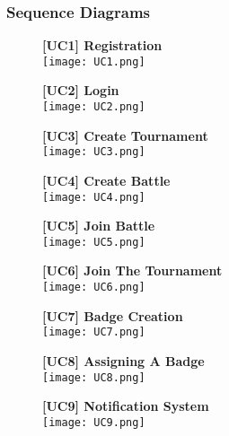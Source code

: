 \documentclass{article}
\begin{document}
\subsubsection{Sequence Diagrams}

\begin{figure}[H]
  \centering
  \textbf{[UC1] Registration} \\
  \texttt{[image: UC1.png]}
\end{figure}

\begin{figure}[H]
  \centering
  \textbf{[UC2] Login} \\
  \texttt{[image: UC2.png]}
\end{figure}

\begin{figure}[H]
  \centering
  \textbf{[UC3] Create Tournament} \\
  \texttt{[image: UC3.png]}
\end{figure}

\begin{figure}[H]
  \centering
  \textbf{[UC4] Create Battle} \\
  \texttt{[image: UC4.png]}
\end{figure}

\begin{figure}[H]
  \centering
  \textbf{[UC5] Join Battle} \\
  \texttt{[image: UC5.png]}
\end{figure}

\begin{figure}[H]
  \centering
  \textbf{[UC6] Join The Tournament} \\
  \texttt{[image: UC6.png]}
\end{figure}

\begin{figure}[H]
  \centering
  \textbf{[UC7] Badge Creation} \\
  \texttt{[image: UC7.png]}
\end{figure}

\begin{figure}[H]
  \centering
  \textbf{[UC8] Assigning A Badge} \\
  \texttt{[image: UC8.png]}
\end{figure}

\begin{figure}[H]
  \centering
  \textbf{[UC9] Notification System} \\
  \texttt{[image: UC9.png]}
\end{figure}
\end{document}
